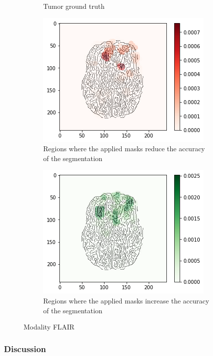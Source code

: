 \begin{figure}[H]
\begin{subfigure}[t]{.4\textwidth}
        \caption{Tumor ground truth}
    \end{subfigure}
    \begin{subfigure}[t]{.45\textwidth}
        \centering
        \includegraphics[width=\linewidth]{chapters/06_hdm/c_Brats18_2013_17_1_L1/58.png}
        \caption{Regions where the applied masks reduce the accuracy of the segmentation}
    \end{subfigure}\hspace{1cm}%
    \begin{subfigure}[t]{.45\textwidth}
        \centering
        \includegraphics[width=\linewidth]{chapters/06_hdm/c_Brats18_2013_17_1_L1/59.png}
        \caption{Regions where the applied masks increase the accuracy of the segmentation}
    \end{subfigure}
    \caption{Modality FLAIR}
\end{figure}

\subsubsection{Discussion}
